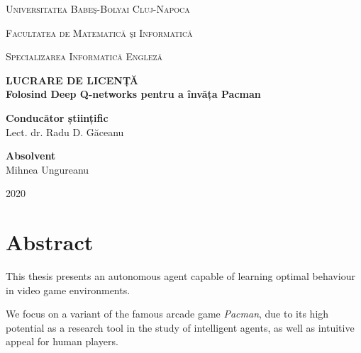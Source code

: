 \documentclass[12pt,twoside]{report}
\newcommand\blankpage{%
    \null
    \thispagestyle{empty}%
    \addtocounter{page}{-1}%
    \newpage}
\begin{document}
\begin{titlepage}
    \center %
    
    {\scshape\LARGE Universitatea Babeş-Bolyai Cluj-Napoca \par}
    \vspace{0.125cm}
    {\scshape\LARGE Facultatea de Matematică şi Informatică \par}
    \vspace{0.125cm}
    {\scshape\LARGE Specializarea Informatică Engleză \par}
    \vspace{5cm}
    
    {
        \bfseries
        \LARGE LUCRARE DE LICENȚĂ \\[1.5cm]
        \huge Folosind Deep Q-networks pentru a învăța Pacman
    }\\[4cm]
    
    \begin{flushleft}
        \Large
            \textbf{Conducător științific}
            \vspace{0.2cm}\\
        \Large
            Lect. dr. Radu D. Găceanu
            \vspace{0.125cm}\\
    \end{flushleft}
    
    \begin{flushright}
        \Large
            \textbf{Absolvent}
            \vspace{0.2cm}\\
        \Large
            Mihnea Ungureanu
    \end{flushright}
    
    \vfill
    
    {\center \large 2020}
    
\end{titlepage}

\blankpage

\chapter*{Abstract}
This thesis presents an autonomous agent capable of learning optimal behaviour in video game environments.

We focus on a variant of the famous arcade game \emph{Pacman}, due to its high potential as a research tool in the study of intelligent agents, as well as intuitive appeal for human players.
\end{document}
